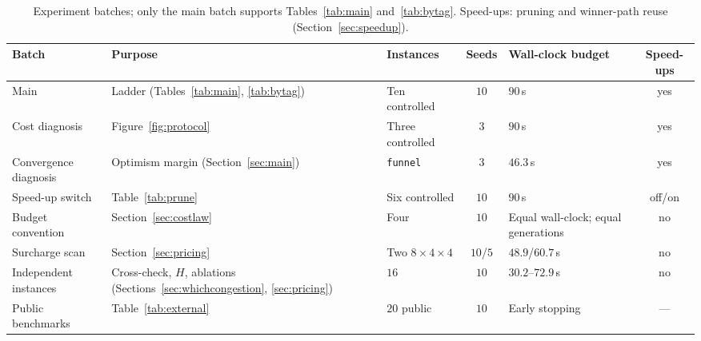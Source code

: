 \documentclass[preprint,review,12pt,authoryear]{elsarticle}
\newcommand{\NSeeds}{10}
\newcommand{\MatrixCells}{16}
\newcommand{\PubNInst}{20}
\begin{document}
\begin{table}[!htbp]
\caption{Experiment batches; only the main batch supports Tables~\ref{tab:main} and~\ref{tab:bytag}. Speed-ups: pruning and winner-path reuse (Section~\ref{sec:speedup}).}
\label{tab:batches}
\footnotesize
\begin{adjustbox}{max width=\linewidth}\begin{tabular}{@{}>{\raggedright\arraybackslash}p{2.3cm}>{\raggedright\arraybackslash}p{3.2cm}>{\raggedright\arraybackslash}p{2.1cm}c>{\raggedright\arraybackslash}p{2.4cm}c@{}}
\toprule
Batch & Purpose & Instances & Seeds & Wall-clock budget & Speed-ups \\
\midrule
Main & Ladder (Tables~\ref{tab:main}, \ref{tab:bytag}) & Ten controlled & $\NSeeds$ & $90$\,s & yes \\
Cost diagnosis & Figure~\ref{fig:protocol} & Three controlled & $3$ & $90$\,s & yes \\
Convergence diagnosis & Optimism margin (Section~\ref{sec:main}) & \texttt{funnel} & $3$ & $46.3$\,s & yes \\
Speed-up switch & Table~\ref{tab:prune} & Six controlled & $10$ & $90$\,s & off/on \\
Budget convention & Section~\ref{sec:costlaw} & Four & $10$ & Equal wall-clock; equal generations & no \\
Surcharge scan & Section~\ref{sec:pricing} & Two $8\times4\times4$ & $10$/$5$ & $48.9$/$60.7$\,s & no \\
Independent instances & Cross-check, $H$, ablations (Sections~\ref{sec:whichcongestion}, \ref{sec:pricing}) & $\MatrixCells$ & $10$ & $30.2$--$72.9$\,s & no \\
Public benchmarks & Table~\ref{tab:external} & $\PubNInst$ public & $\NSeeds$ & Early stopping & --- \\
\bottomrule
\end{tabular}\end{adjustbox}
\end{table}
\end{document}
